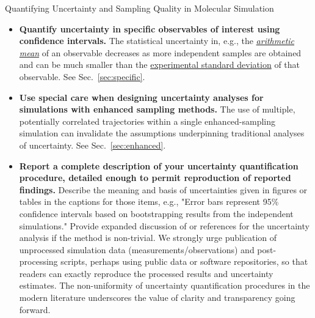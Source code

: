 \begin{Checklists*}[p!]
\begin{checklist}{Quantifying Uncertainty and Sampling Quality in Molecular Simulation}
\begin{itemize}
\item
  \textbf{Quantify uncertainty in specific observables of interest using confidence intervals.}
  The statistical uncertainty in, e.g., the \hyperref[def:arith_mean]{\emph{arithmetic mean}} of an observable decreases as more independent samples are obtained and can be much smaller than the \hyperref[def:exp_st_dev]{experimental standard deviation} of that observable.
  See Sec.\ \ref{sec:specific}.
 
\item
  \textbf{Use special care when designing uncertainty analyses for simulations with enhanced sampling methods.}
  The use of multiple, potentially correlated trajectories within a single enhanced-sampling simulation can invalidate the assumptions underpinning traditional analyses of uncertainty.
  See Sec.\ \ref{sec:enhanced}.

\item
\textbf{Report a complete description of your uncertainty quantification procedure, detailed enough to permit reproduction of reported findings.}
Describe the meaning and basis of uncertainties given in figures or tables in the captions for those items, e.g., "Error bars represent 95\% confidence intervals based on bootstrapping results from the independent simulations."
Provide expanded discussion of or references for the uncertainty analysis if the method is non-trivial.
We strongly urge publication of unprocessed simulation data (measurements/observations) and post-processing scripts, perhaps using public data or software repositories, so that readers can exactly reproduce the processed results and uncertainty estimates. 
The non-uniformity of uncertainty quantification procedures in the modern literature underscores the value of clarity and transparency going forward.

\end{itemize}
\end{checklist}
\end{Checklists*}
